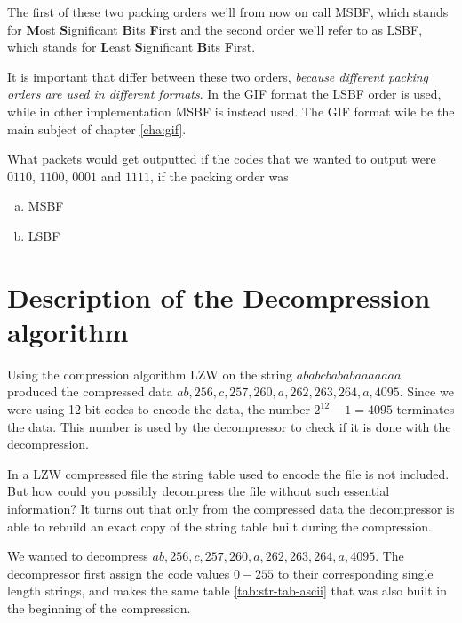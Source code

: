 The first of these two packing orders we'll from now on call
MSBF, which stands for \textbf{M}ost \textbf{S}ignificant
\textbf{B}its \textbf{F}irst and the second order we'll refer to as
LSBF, which stands for \textbf{L}east \textbf{S}ignificant
\textbf{B}its \textbf{F}irst.

It is important that differ between these two orders, \textit{because
  different packing orders are used in different formats}. In the GIF
format the LSBF order is used, while in other implementation MSBF is
instead used. The GIF format wile be the main
subject of chapter
\ref{cha:gif}.

\begin{Exercise}[label={bit-packing-order}]

  What packets would get outputted if the codes that we wanted to
  output were $0110$, $1100$, $0001$ and $1111$, if the packing order
  was

  \begin{enumerate}[(a)]
  \item MSBF
  \item LSBF
  \end{enumerate}

\end{Exercise}

\section{Description of the Decompression algorithm}

Using the compression algorithm LZW on the string $ababcbababaaaaaaa$
produced the compressed data $ab, 256,c, 257, 260, a, 262, 263, 264,
a,4095$. Since we were using 12-bit codes to encode the data, the
number $2^{12} - 1 = 4095$ terminates the data. This number is used by
the decompressor to check if it is done with the decompression.

In a LZW compressed file the string table used to encode the file is
not included. But how could you possibly decompress the file without
such essential information? It turns out that only from the compressed
data the decompressor is able to rebuild an exact copy of the string
table built during the compression.

We wanted to decompress $ab, 256,c, 257, 260, a, 262, 263, 264,
a,4095$. The decompressor first assign the code values $0-255$ to
their corresponding single length strings, and makes the same table
\ref{tab:str-tab-ascii} that was also built in the beginning of the
compression.


